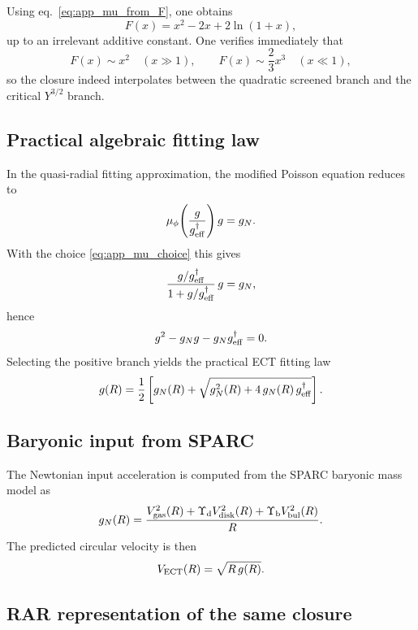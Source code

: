 \documentclass[11pt,a4paper]{article}
\numberwithin{equation}{section}
\begin{document}
Using eq.~\eqref{eq:app_mu_from_F}, one obtains
\begin{equation}
F(x)=x^2-2x+2\ln(1+x),
\label{eq:app_F_choice}
\end{equation}
up to an irrelevant additive constant.  One verifies immediately that
\[
F(x)\sim x^2 \quad (x\gg1),
\qquad
F(x)\sim \frac{2}{3}x^3 \quad (x\ll1),
\]
so the closure indeed interpolates between the quadratic screened branch
and the critical $Y^{3/2}$ branch.

\subsection{Practical algebraic fitting law}

In the quasi-radial fitting approximation, the modified Poisson
equation reduces to
\begin{equation}
\mu_\phi\!\left(\frac{g}{g^\dagger_{\rm eff}}\right) g = g_N.
\label{eq:app_mu_gn}
\end{equation}
With the choice \eqref{eq:app_mu_choice} this gives
\begin{equation}
\frac{g/g^\dagger_{\rm eff}}{1+g/g^\dagger_{\rm eff}}\,g=g_N,
\end{equation}
hence
\begin{equation}
g^2-g_N g-g_N g^\dagger_{\rm eff}=0.
\end{equation}
Selecting the positive branch yields the practical ECT fitting law
\begin{equation}
g(R)=\frac{1}{2}\left[g_N(R)+\sqrt{g_N^2(R)+4\,g_N(R)\,g^\dagger_{\rm eff}}\right].
\label{eq:app_final_g_law}
\end{equation}

\subsection{Baryonic input from SPARC}

The Newtonian input acceleration is computed from the SPARC baryonic
mass model as
\begin{equation}
g_N(R)=
\frac{
V_{\rm gas}^2(R)+\Upsilon_{\rm d}V_{\rm disk}^2(R)+
\Upsilon_{\rm b}V_{\rm bul}^2(R)
}{R}.
\label{eq:app_gn_sparc}
\end{equation}
The predicted circular velocity is then
\begin{equation}
V_{\rm ECT}(R)=\sqrt{R\,g(R)}.
\label{eq:app_vect}
\end{equation}

\subsection{RAR representation of the same closure}
\end{document}
